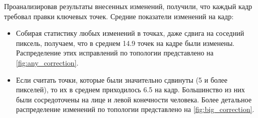 Проанализировав результаты внесенных изменений, получили, что каждый кадр требовал правки ключевых точек. Средние показатели изменений на кадр:

\begin{itemize}
\item Собирая статистику любых изменений в точках, даже сдвига на соседний пиксель, получаем, что в среднем 14.9 точек на кадре были изменены. Распределение этих исправлений по топологии представлено на \autoref{fig:any_correction}.
\item Если считать точки, которые были значительно сдвинуты (5 и более пикселей), то их в среднем приходилось 6.5 на кадр. Большинство из них были сосредоточены на лице и левой конечности человека. Более детальное распределение изменений по топологии представлено на \autoref{fig:big_correction}.
\end{itemize}

